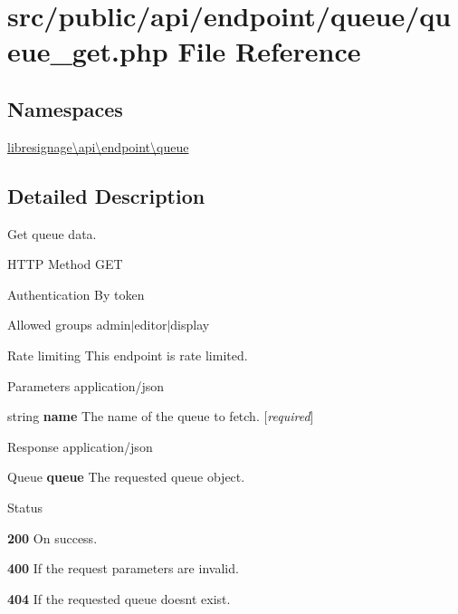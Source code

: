 \hypertarget{src_2public_2api_2endpoint_2queue_2queue__get_8php}{}\section{src/public/api/endpoint/queue/queue\+\_\+get.php File Reference}
\label{src_2public_2api_2endpoint_2queue_2queue__get_8php}
\subsection*{Namespaces}
\begin{DoxyCompactItemize}
\item 
 \hyperlink{namespacelibresignage_1_1api_1_1endpoint_1_1queue}{libresignage\textbackslash{}api\textbackslash{}endpoint\textbackslash{}queue}
\end{DoxyCompactItemize}


\subsection{Detailed Description}
Get queue data.

\begin{DoxyParagraph}{H\+T\+TP Method}
G\+ET 
\end{DoxyParagraph}
\begin{DoxyParagraph}{Authentication}
By token 
\end{DoxyParagraph}
\begin{DoxyParagraph}{Allowed groups}
{\ttfamily admin$\vert$editor$\vert$display} 
\end{DoxyParagraph}
\begin{DoxyParagraph}{Rate limiting}
This endpoint is rate limited.
\end{DoxyParagraph}
\begin{DoxyParagraph}{Parameters}
application/json
\begin{DoxyItemize}
\item {\ttfamily string} {\bfseries name} The name of the queue to fetch. \mbox{[}{\itshape required}\mbox{]}
\end{DoxyItemize}
\end{DoxyParagraph}
\begin{DoxyParagraph}{Response}
application/json
\begin{DoxyItemize}
\item {\ttfamily Queue} {\bfseries queue} The requested queue object.
\end{DoxyItemize}
\end{DoxyParagraph}
\begin{DoxyParagraph}{Status}

\begin{DoxyItemize}
\item {\bfseries 200} On success.
\item {\bfseries 400} If the request parameters are invalid.
\item {\bfseries 404} If the requested queue doesn\textquotesingle{}t exist. 
\end{DoxyItemize}
\end{DoxyParagraph}
